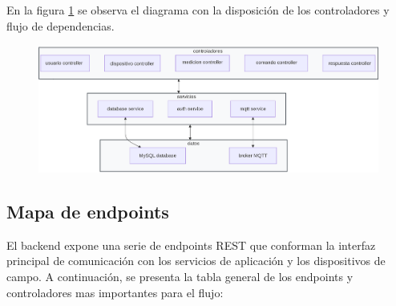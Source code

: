 En la figura \ref{fig:diagrama_controladores} se observa el diagrama con la disposición de los controladores y flujo de dependencias.

\begin{figure}[H]
 
  \centering
  \includegraphics[scale=0.118]{./Figures/diagDispoControlladores.png}
  \label{fig:diagrama_controladores}
  \end{figure}



\subsection{Mapa de endpoints}

El backend expone una serie de endpoints REST que conforman la interfaz principal de comunicación con los servicios de aplicación y los dispositivos de campo.  
A continuación, se presenta la tabla general de los endpoints y controladores mas importantes para el flujo:

